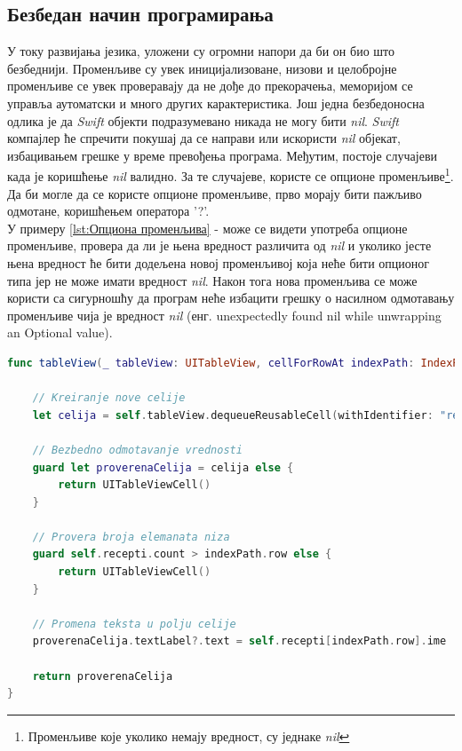 \documentclass[12pt,oneside]{memoir}
\begin{document}
\subsection{Безбедан начин програмирања}

\indent У току развијања језика, уложени су огромни напори да би он био што безбеднији. Променљиве су увек иницијализоване, низови и целобројне променљиве се увек проверавају да не дође до прекорачења, меморијом се управља аутоматски и много других карактеристика.
Још једна безбедоносна одлика је да \textit{Swift} објекти подразумевано никада не могу бити \textit{nil}. \textit{Swift} компајлер ће спречити покушај да се направи или искористи \textit{nil} објекат, избацивањем грешке у време превођења програма.
Међутим, постоје случајеви када је коришћење \textit{nil} валидно. За те случајеве, користе се опционе променљиве\footnote{Променљиве које уколико немају вредност, су једнаке \textit{nil}}. Да би могле да се користе опционе променљиве, прво морају бити пажљиво одмотане, коришћењем оператора '?'.
\\
\indent У примеру \ref{lst:Опциона променљива} -  може се видети употреба опционе променљиве, провера да ли је њена вредност различита од \textit{nil} и уколико јесте њена вредност ће бити додељена новој променљивој која неће бити опционог типа јер не може имати вредност \textit{nil}. Након тога нова променљива се може користи са сигурношћу да програм неће избацити грешку о насилном одмотавању променљиве чија је вредност \textit{nil} (енг. unexpectedly found nil while unwrapping an Optional value).

\begin{lstlisting}[caption=\textit{{Коришћење опционе променљиве}}, label={lst:Опциона променљива}, language=Swift, frame=single]
func tableView(_ tableView: UITableView, cellForRowAt indexPath: IndexPath) -> UITableViewCell {
        
    // Kreiranje nove celije
    let celija = self.tableView.dequeueReusableCell(withIdentifier: "receptCelija") as? UITableViewCell
    
    // Bezbedno odmotavanje vrednosti
    guard let proverenaCelija = celija else {
        return UITableViewCell()
    }
    
    // Provera broja elemanata niza
    guard self.recepti.count > indexPath.row else {
        return UITableViewCell()
    }
    
    // Promena teksta u polju celije
    proverenaCelija.textLabel?.text = self.recepti[indexPath.row].ime
    
    return proverenaCelija
}

\end{lstlisting}
\end{document}
